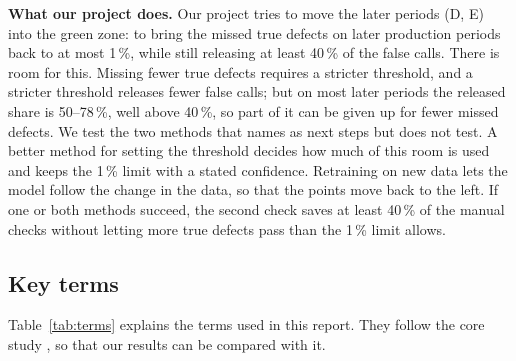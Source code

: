 \documentclass[11pt,a4paper]{article}
\begin{document}
\textbf{What our project does.} Our project tries to move the later periods (D, E) into the green zone: to bring the missed true defects on later production periods back to at most 1\,\%, while still releasing at least 40\,\% of the false calls. There is room for this. Missing fewer true defects requires a stricter threshold, and a stricter threshold releases fewer false calls; but on most later periods the released share is 50--78\,\%, well above 40\,\%, so part of it can be given up for fewer missed defects. We test the two methods that \cite{pfab2025} names as next steps but does not test. A better method for setting the threshold decides how much of this room is used and keeps the 1\,\% limit with a stated confidence. Retraining on new data lets the model follow the change in the data, so that the points move back to the left. If one or both methods succeed, the second check saves at least 40\,\% of the manual checks without letting more true defects pass than the 1\,\% limit allows.

\subsection{Key terms}
Table~\ref{tab:terms} explains the terms used in this report. They follow the core study \cite{pfab2025}, so that our results can be compared with it.
\end{document}
